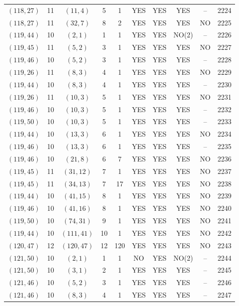 \begin{longtable}{|c|c|c|c|c|c|c|c|c|c|}
$(118, 27)$ & 11 & $(11, 4)$ & 5 & 1 & YES & YES & YES & -- & 2224\\
$(118, 27)$ & 11 & $(32, 7)$ & 8 & 2 & YES & YES & YES & NO & 2225\\
$(119, 44)$ & 10 & $(2, 1)$ & 1 & 1 & YES & YES & NO(2) & -- & 2226\\
$(119, 45)$ & 11 & $(5, 2)$ & 3 & 1 & YES & YES & YES & NO & 2227\\
$(119, 46)$ & 10 & $(5, 2)$ & 3 & 1 & YES & YES & YES & -- & 2228\\
$(119, 26)$ & 11 & $(8, 3)$ & 4 & 1 & YES & YES & YES & NO & 2229\\
$(119, 44)$ & 10 & $(8, 3)$ & 4 & 1 & YES & YES & YES & -- & 2230\\
$(119, 26)$ & 11 & $(10, 3)$ & 5 & 1 & YES & YES & YES & NO & 2231\\
$(119, 46)$ & 10 & $(10, 3)$ & 5 & 1 & YES & YES & YES & -- & 2232\\
$(119, 50)$ & 10 & $(10, 3)$ & 5 & 1 & YES & YES & YES & -- & 2233\\
$(119, 44)$ & 10 & $(13, 3)$ & 6 & 1 & YES & YES & YES & NO & 2234\\
$(119, 46)$ & 10 & $(13, 3)$ & 6 & 1 & YES & YES & YES & -- & 2235\\
$(119, 46)$ & 10 & $(21, 8)$ & 6 & 7 & YES & YES & YES & NO & 2236\\
$(119, 45)$ & 11 & $(31, 12)$ & 7 & 1 & YES & YES & YES & NO & 2237\\
$(119, 45)$ & 11 & $(34, 13)$ & 7 & 17 & YES & YES & YES & NO & 2238\\
$(119, 44)$ & 10 & $(41, 15)$ & 8 & 1 & YES & YES & YES & NO & 2239\\
$(119, 46)$ & 10 & $(41, 16)$ & 8 & 1 & YES & YES & YES & NO & 2240\\
$(119, 50)$ & 10 & $(74, 31)$ & 9 & 1 & YES & YES & YES & NO & 2241\\
$(119, 44)$ & 10 & $(111, 41)$ & 10 & 1 & YES & YES & YES & NO & 2242\\
$(120, 47)$ & 12 & $(120, 47)$ & 12 & 120 & YES & YES & YES & NO & 2243\\
$(121, 50)$ & 10 & $(2, 1)$ & 1 & 1 & NO & YES & NO(2) & -- & 2244\\
$(121, 50)$ & 10 & $(3, 1)$ & 2 & 1 & YES & YES & YES & -- & 2245\\
$(121, 46)$ & 10 & $(5, 2)$ & 3 & 1 & YES & YES & YES & -- & 2246\\
$(121, 46)$ & 10 & $(8, 3)$ & 4 & 1 & YES & YES & YES & -- & 2247\\

\end{longtable}
